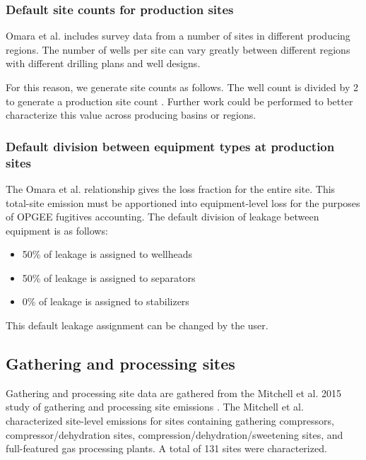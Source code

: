 \documentclass[11pt]{report}
\begin{document}
\subsubsection{Default site counts for production sites}

Omara et al. includes survey data from a number of sites in different producing regions. The number of wells per site can vary greatly between different regions with different drilling plans and well designs. 

For this reason, we generate site counts as follows. The well count is divided by 2 to generate a production site count \cite{Englander2018}. Further work could be performed to better characterize this value across producing basins or regions.

\subsubsection{Default division between equipment types at production sites}

The Omara et al. relationship gives the loss fraction for the entire site. This total-site emission must be apportioned into equipment-level loss for the purposes of OPGEE fugitives accounting. The default division of leakage between equipment is as follows:
\begin{itemize}
\item 50\% of leakage is assigned to wellheads
\item 50\% of leakage is assigned to separators
\item 0\% of leakage is assigned to stabilizers 
\end{itemize}
This default leakage assignment can be changed by the user.

\subsection{Gathering and processing sites}

Gathering and processing site data are gathered from the Mitchell et al. 2015 study of gathering and processing site emissions \cite{Mitchell2015}. The Mitchell et al. characterized site-level emissions for sites containing gathering compressors, compressor/dehydration sites, compression/dehydration/sweetening sites, and full-featured gas processing plants. A total of 131 sites were characterized.  
\end{document}
